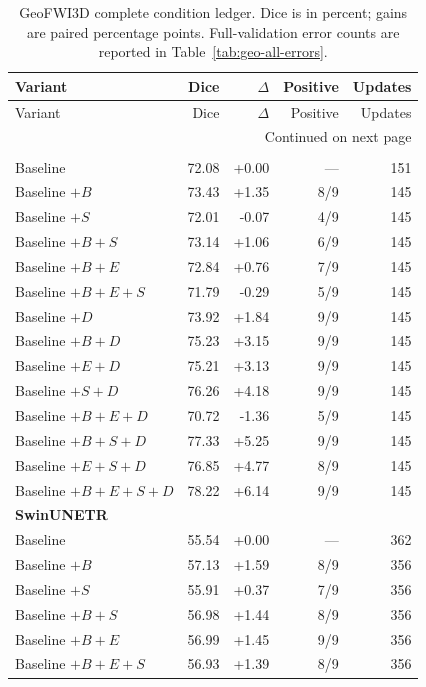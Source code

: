 \begingroup\footnotesize{}
\setlength{\tabcolsep}{4pt}
\begin{longtable}{@{}lrrrr@{}}
\caption{GeoFWI3D complete condition ledger. Dice is in percent; gains are paired percentage points. Full-validation error counts are reported in Table~\ref{tab:geo-all-errors}.}\label{tab:geo-ledger}\\
\hline
Variant & Dice & $\Delta$ & Positive & Updates \\ \hline
\endfirsthead
\hline
Variant & Dice & $\Delta$ & Positive & Updates \\ \hline
\endhead
\hline
\multicolumn{5}{r}{Continued on next page}\\
\endfoot
\hline
\endlastfoot
\multicolumn{5}{l}{\textbf{nnU-Net}}\\[.3em]
Baseline & 72.08 & +0.00 & --- & 151 \\
Baseline $+B$ & 73.43 & +1.35 & 8/9 & 145 \\
Baseline $+S$ & 72.01 & -0.07 & 4/9 & 145 \\
Baseline $+B+S$ & 73.14 & +1.06 & 6/9 & 145 \\
Baseline $+B+E$ & 72.84 & +0.76 & 7/9 & 145 \\
Baseline $+B+E+S$ & 71.79 & -0.29 & 5/9 & 145 \\
Baseline $+D$ & 73.92 & +1.84 & 9/9 & 145 \\
Baseline $+B+D$ & 75.23 & +3.15 & 9/9 & 145 \\
Baseline $+E+D$ & 75.21 & +3.13 & 9/9 & 145 \\
Baseline $+S+D$ & 76.26 & +4.18 & 9/9 & 145 \\
Baseline $+B+E+D$ & 70.72 & -1.36 & 5/9 & 145 \\
Baseline $+B+S+D$ & 77.33 & +5.25 & 9/9 & 145 \\
Baseline $+E+S+D$ & 76.85 & +4.77 & 8/9 & 145 \\
Baseline $+B+E+S+D$ & 78.22 & +6.14 & 9/9 & 145 \\
\multicolumn{5}{l}{\textbf{SwinUNETR}}\\[.3em]
Baseline & 55.54 & +0.00 & --- & 362 \\
Baseline $+B$ & 57.13 & +1.59 & 8/9 & 356 \\
Baseline $+S$ & 55.91 & +0.37 & 7/9 & 356 \\
Baseline $+B+S$ & 56.98 & +1.44 & 8/9 & 356 \\
Baseline $+B+E$ & 56.99 & +1.45 & 9/9 & 356 \\
Baseline $+B+E+S$ & 56.93 & +1.39 & 8/9 & 356 \\

\end{longtable}
